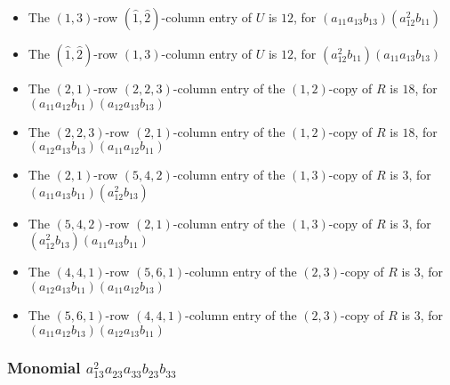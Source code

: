 \documentclass{article}
\begin{document}
\begin{itemize}
\item The $ \left(1, 3\right) $-row $ (\hat{1}, \hat{2}) $-column entry of $U$ is $ 12 $, for $( a_{11} a_{13} b_{13} )( a_{12}^{2} b_{11} )$ 
\item The $(\hat{1}, \hat{2})$-row $ \left(1, 3\right) $-column entry of $U$ is $ 12 $, for $( a_{12}^{2} b_{11} )( a_{11} a_{13} b_{13} )$ 
\item The $(2, 1)$-row $(2, 2, 3)$-column entry of the $ \left(1, 2\right) $-copy of $R$ is $ 18 $, for $( a_{11} a_{12} b_{11} )( a_{12} a_{13} b_{13} )$ 
\item The $(2, 2, 3)$-row $(2, 1)$-column entry of the $ \left(1, 2\right) $-copy of $R$ is $ 18 $, for $( a_{12} a_{13} b_{13} )( a_{11} a_{12} b_{11} )$ 
\item The $(2, 1)$-row $(5, 4, 2)$-column entry of the $ \left(1, 3\right) $-copy of $R$ is $ 3 $, for $( a_{11} a_{13} b_{11} )( a_{12}^{2} b_{13} )$ 
\item The $(5, 4, 2)$-row $(2, 1)$-column entry of the $ \left(1, 3\right) $-copy of $R$ is $ 3 $, for $( a_{12}^{2} b_{13} )( a_{11} a_{13} b_{11} )$ 
\item The $(4, 4, 1)$-row $(5, 6, 1)$-column entry of the $ \left(2, 3\right) $-copy of $R$ is $ 3 $, for $( a_{12} a_{13} b_{11} )( a_{11} a_{12} b_{13} )$ 
\item The $(5, 6, 1)$-row $(4, 4, 1)$-column entry of the $ \left(2, 3\right) $-copy of $R$ is $ 3 $, for $( a_{11} a_{12} b_{13} )( a_{12} a_{13} b_{11} )$ 
\end{itemize}
\subsubsection{Monomial $ a_{13}^{2} a_{23} a_{33} b_{23} b_{33} $}
\end{document}
